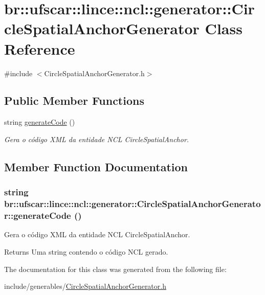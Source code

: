 \hypertarget{classbr_1_1ufscar_1_1lince_1_1ncl_1_1generator_1_1CircleSpatialAnchorGenerator}{
\section{br::ufscar::lince::ncl::generator::CircleSpatialAnchorGenerator Class Reference}
\label{classbr_1_1ufscar_1_1lince_1_1ncl_1_1generator_1_1CircleSpatialAnchorGenerator}
}


{\ttfamily \#include $<$CircleSpatialAnchorGenerator.h$>$}

\subsection*{Public Member Functions}
\begin{DoxyCompactItemize}
\item 
string \hyperlink{classbr_1_1ufscar_1_1lince_1_1ncl_1_1generator_1_1CircleSpatialAnchorGenerator_ac3fe4b6cd443e7094d9f44c68a2ebf08}{generateCode} ()
\begin{DoxyCompactList}\small\item\em Gera o código XML da entidade NCL CircleSpatialAnchor. \item\end{DoxyCompactList}\end{DoxyCompactItemize}


\subsection{Member Function Documentation}
\hypertarget{classbr_1_1ufscar_1_1lince_1_1ncl_1_1generator_1_1CircleSpatialAnchorGenerator_ac3fe4b6cd443e7094d9f44c68a2ebf08}{
\subsubsection[{generateCode}]{\setlength{\rightskip}{0pt plus 5cm}string br::ufscar::lince::ncl::generator::CircleSpatialAnchorGenerator::generateCode ()}}
\label{classbr_1_1ufscar_1_1lince_1_1ncl_1_1generator_1_1CircleSpatialAnchorGenerator_ac3fe4b6cd443e7094d9f44c68a2ebf08}


Gera o código XML da entidade NCL CircleSpatialAnchor. 

\begin{DoxyReturn}{Returns}
Uma string contendo o código NCL gerado. 
\end{DoxyReturn}


The documentation for this class was generated from the following file:\begin{DoxyCompactItemize}
\item 
include/generables/\hyperlink{CircleSpatialAnchorGenerator_8h}{CircleSpatialAnchorGenerator.h}\end{DoxyCompactItemize}
